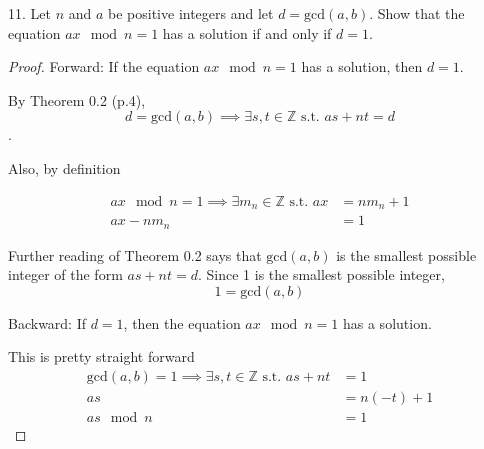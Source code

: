 11. Let $n$ and $a$ be positive integers and let $d=\text{gcd}(a,b)$. Show that the equation $ax\mod n = 1$ has a solution if and only if $d=1$.

\begin{proof}
Forward: If the equation $ax\mod n = 1$ has a solution, then $d=1$.

By Theorem 0.2 (p.4),
 \[ d=\text{gcd}(a,b) \implies \exists s,t \in \mathbb{Z} \text{ s.t. } as + nt = d\].

 Also, by definition

 \begin{align*}
 ax\mod n = 1 \implies \exists m_n \in \mathbb{Z} \text{ s.t. } ax &= nm_n + 1 \\
 ax - nm_n &= 1
 \end{align*}

Further reading of Theorem 0.2 says that $\text{gcd}(a,b)$ is the smallest possible integer of the form $as + nt = d$. Since 1 is the smallest possible integer, 
\[1 = \text{gcd}(a,b)\]

Backward: If $d=1$, then the equation $ax\mod n = 1$ has a solution.

This is pretty straight forward
\begin{align*}
\text{gcd}(a,b) = 1 \implies \exists s,t \in \mathbb{Z} \text{ s.t. } as + nt &= 1 \\
as &= n (-t) + 1\\
as \mod n &= 1
\end{align*}
\end{proof}
